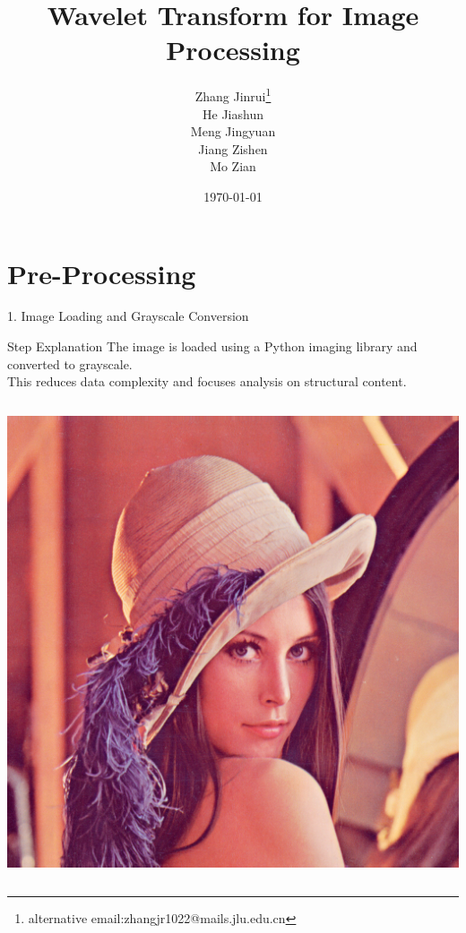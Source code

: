 \documentclass{beamer}
\title{Wavelet Transform for Image Processing}
\author{
\texorpdfstring{
Zhang Jinrui\thanks{alternative email:zhangjr1022@mails.jlu.edu.cn}
\\
He Jiashun
\\
Meng Jingyuan
\\
Jiang Zishen
\\
Mo Zian
}
{
Zhang Jinrui\thanks{alternative email:zhangjr1022@mails.jlu.edu.cn}
,
He Jiashun
,
Meng Jingyuan
,
Jiang Zishen
,
Mo Zian
}
}
\date{\today}
\begin{document}
\frame{\titlepage}  %

\section{Pre-Processing}
\begin{frame}{1. Image Loading and Grayscale Conversion}
    \begin{block}{Step Explanation}
        The image is loaded using a Python imaging library and converted to grayscale. \\
        This reduces data complexity and focuses analysis on structural content.
    \end{block}

    \vspace{0.5cm}
    \begin{columns}
        \centering
        \includegraphics[width=\linewidth]{fig/lena.jpg}


\end{columns}
\end{frame}
\end{document}
